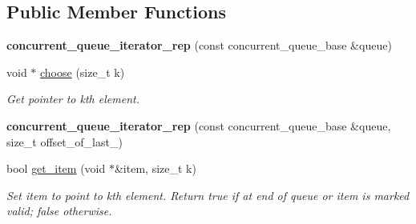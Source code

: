 \subsection*{Public Member Functions}
\begin{DoxyCompactItemize}
\item 
\hypertarget{classtbb_1_1internal_1_1concurrent__queue__iterator__rep_a419fb8f82ad23c0a77bd7b68f595598b}{}{\bfseries concurrent\+\_\+queue\+\_\+iterator\+\_\+rep} (const concurrent\+\_\+queue\+\_\+base \&queue)\label{classtbb_1_1internal_1_1concurrent__queue__iterator__rep_a419fb8f82ad23c0a77bd7b68f595598b}

\item 
\hypertarget{classtbb_1_1internal_1_1concurrent__queue__iterator__rep_ad16aeb069b8f599b33dca7f28126fd88}{}void $\ast$ \hyperlink{classtbb_1_1internal_1_1concurrent__queue__iterator__rep_ad16aeb069b8f599b33dca7f28126fd88}{choose} (size\+\_\+t k)\label{classtbb_1_1internal_1_1concurrent__queue__iterator__rep_ad16aeb069b8f599b33dca7f28126fd88}

\begin{DoxyCompactList}\small\item\em Get pointer to kth element. \end{DoxyCompactList}\item 
\hypertarget{classtbb_1_1internal_1_1concurrent__queue__iterator__rep_a868a3f6a30a5bd8b089832e61e846a29}{}{\bfseries concurrent\+\_\+queue\+\_\+iterator\+\_\+rep} (const concurrent\+\_\+queue\+\_\+base \&queue, size\+\_\+t offset\+\_\+of\+\_\+last\+\_\+)\label{classtbb_1_1internal_1_1concurrent__queue__iterator__rep_a868a3f6a30a5bd8b089832e61e846a29}

\item 
\hypertarget{classtbb_1_1internal_1_1concurrent__queue__iterator__rep_a7324d705f2db54b6e39b4881d8ea9b98}{}bool \hyperlink{classtbb_1_1internal_1_1concurrent__queue__iterator__rep_a7324d705f2db54b6e39b4881d8ea9b98}{get\+\_\+item} (void $\ast$\&item, size\+\_\+t k)\label{classtbb_1_1internal_1_1concurrent__queue__iterator__rep_a7324d705f2db54b6e39b4881d8ea9b98}

\begin{DoxyCompactList}\small\item\em Set item to point to kth element. Return true if at end of queue or item is marked valid; false otherwise. \end{DoxyCompactList}\end{DoxyCompactItemize}
